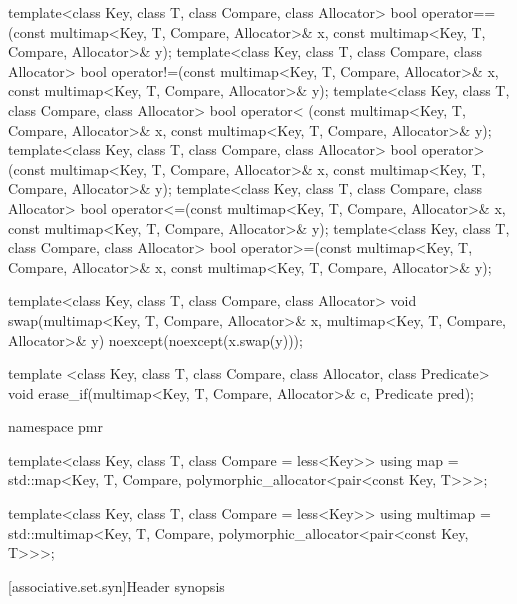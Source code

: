\begin{codeblock}
{  template<class Key, class T, class Compare, class Allocator>
    bool operator==(const multimap<Key, T, Compare, Allocator>& x,
                    const multimap<Key, T, Compare, Allocator>& y);
  template<class Key, class T, class Compare, class Allocator>
    bool operator!=(const multimap<Key, T, Compare, Allocator>& x,
                    const multimap<Key, T, Compare, Allocator>& y);
  template<class Key, class T, class Compare, class Allocator>
    bool operator< (const multimap<Key, T, Compare, Allocator>& x,
                    const multimap<Key, T, Compare, Allocator>& y);
  template<class Key, class T, class Compare, class Allocator>
    bool operator> (const multimap<Key, T, Compare, Allocator>& x,
                    const multimap<Key, T, Compare, Allocator>& y);
  template<class Key, class T, class Compare, class Allocator>
    bool operator<=(const multimap<Key, T, Compare, Allocator>& x,
                    const multimap<Key, T, Compare, Allocator>& y);
  template<class Key, class T, class Compare, class Allocator>
    bool operator>=(const multimap<Key, T, Compare, Allocator>& x,
                    const multimap<Key, T, Compare, Allocator>& y);

  template<class Key, class T, class Compare, class Allocator>
    void swap(multimap<Key, T, Compare, Allocator>& x,
              multimap<Key, T, Compare, Allocator>& y)
      noexcept(noexcept(x.swap(y)));

  template <class Key, class T, class Compare, class Allocator, class Predicate>
    void erase_if(multimap<Key, T, Compare, Allocator>& c, Predicate pred);

  namespace pmr {
    template<class Key, class T, class Compare = less<Key>>
      using map = std::map<Key, T, Compare,
                           polymorphic_allocator<pair<const Key, T>>>;

    template<class Key, class T, class Compare = less<Key>>
      using multimap = std::multimap<Key, T, Compare,
                                     polymorphic_allocator<pair<const Key, T>>>;
  }
}
\end{codeblock}

[associative.set.syn]{Header  synopsis}%

%

